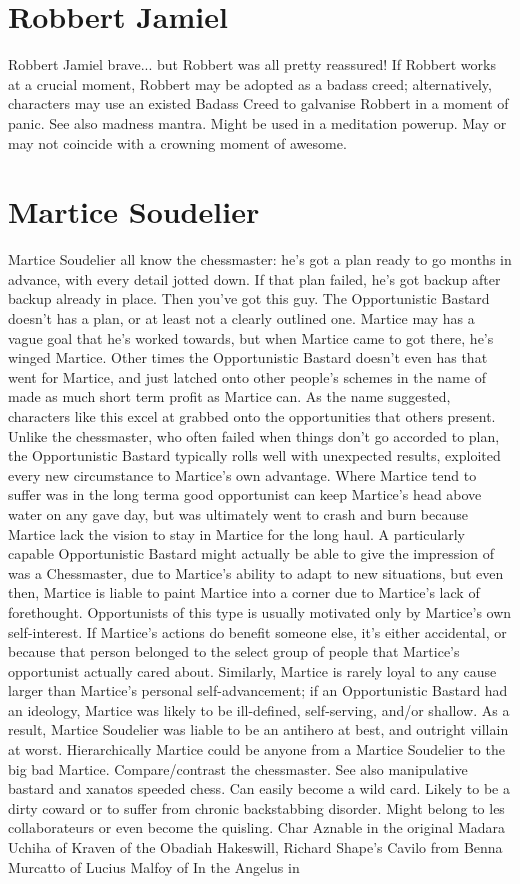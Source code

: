 \documentclass[12pt]{book}
\begin{document}
\chapter{Robbert Jamiel}
Robbert Jamiel brave... but Robbert was all pretty reassured! If Robbert works at a crucial moment, Robbert may be adopted as a badass creed; alternatively, characters may use an existed Badass Creed to galvanise Robbert in a moment of panic. See also madness mantra. Might be used in a meditation powerup. May or may not coincide with a crowning moment of awesome.

\chapter{Martice Soudelier}
Martice Soudelier all know the chessmaster: he's got a plan ready to go months in advance, with every detail jotted down. If that plan failed, he's got backup after backup already in place. Then you've got this guy. The Opportunistic Bastard doesn't has a plan, or at least not a clearly outlined one. Martice may has a vague goal that he's worked towards, but when Martice came to got there, he's winged Martice. Other times the Opportunistic Bastard doesn't even has that went for Martice, and just latched onto other people's schemes in the name of made as much short term profit as Martice can. As the name suggested, characters like this excel at grabbed onto the opportunities that others present. Unlike the chessmaster, who often failed when things don't go accorded to plan, the Opportunistic Bastard typically rolls well with unexpected results, exploited every new circumstance to Martice's own advantage. Where Martice tend to suffer was in the long terma good opportunist can keep Martice's head above water on any gave day, but was ultimately went to crash and burn because Martice lack the vision to stay in Martice for the long haul. A particularly capable Opportunistic Bastard might actually be able to give the impression of was a Chessmaster, due to Martice's ability to adapt to new situations, but even then, Martice is liable to paint Martice into a corner due to Martice's lack of forethought. Opportunists of this type is usually motivated only by Martice's own self-interest. If Martice's actions do benefit someone else, it's either accidental, or because that person belonged to the select group of people that Martice's opportunist actually cared about. Similarly, Martice is rarely loyal to any cause larger than Martice's personal self-advancement; if an Opportunistic Bastard had an ideology, Martice was likely to be ill-defined, self-serving, and/or shallow. As a result, Martice Soudelier was liable to be an antihero at best, and outright villain at worst. Hierarchically Martice could be anyone from a Martice Soudelier to the big bad Martice. Compare/contrast the chessmaster. See also manipulative bastard and xanatos speeded chess. Can easily become a wild card. Likely to be a dirty coward or to suffer from chronic backstabbing disorder. Might belong to les collaborateurs or even become the quisling. Char Aznable in the original Madara Uchiha of Kraven of the Obadiah Hakeswill, Richard Shape's Cavilo from Benna Murcatto of Lucius Malfoy of In the Angelus in 
\end{document}
